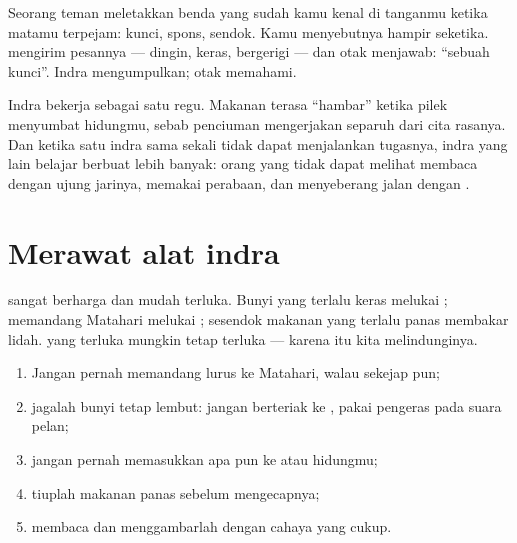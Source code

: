 \begin{example}\label{ex:g1:the-five-senses:dark}
Seorang teman meletakkan benda yang sudah kamu kenal di tanganmu
ketika matamu terpejam: kunci, spons, sendok. Kamu menyebutnya hampir
seketika.  mengirim pesannya --- dingin, keras, bergerigi --- dan
otak menjawab: ``sebuah kunci''. Indra mengumpulkan; otak memahami.
\end{example}

\begin{remark}\label{rem:g1:the-five-senses:together}
Indra bekerja sebagai satu regu. Makanan terasa ``hambar'' ketika
pilek menyumbat hidungmu, sebab penciuman mengerjakan separuh dari
cita rasanya. Dan ketika satu indra sama sekali tidak dapat
menjalankan tugasnya, indra yang lain belajar berbuat lebih banyak:
orang yang tidak dapat melihat membaca dengan ujung jarinya, memakai
perabaan, dan menyeberang jalan dengan .
\end{remark}

\section{Merawat alat indra}

\begin{proposition}\label{prop:g1:the-five-senses:fragile}
 sangat berharga dan mudah terluka. Bunyi yang terlalu keras
melukai ; memandang Matahari melukai ; sesendok makanan
yang terlalu panas membakar lidah.  yang terluka mungkin
tetap terluka --- karena itu kita melindunginya.
\end{proposition}
\admitted

\begin{method}\label{met:g1:the-five-senses:protect}
\begin{enumerate}
  \item Jangan pernah memandang lurus ke Matahari, walau sekejap pun;
  \item jagalah bunyi tetap lembut: jangan berteriak ke , pakai
        pengeras  pada suara pelan;
  \item jangan pernah memasukkan apa pun ke  atau hidungmu;
  \item tiuplah makanan panas sebelum mengecapnya;
  \item membaca dan menggambarlah dengan cahaya yang cukup.
\end{enumerate}
\end{method}

